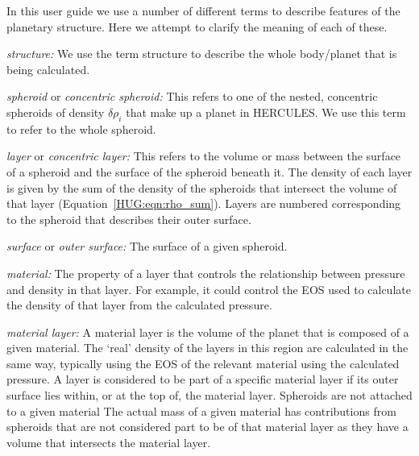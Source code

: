 \documentclass[11pt, oneside]{article}   	%
\begin{document}
%
\vspace{0.5cm}
\begin{tcolorbox}[colback=white, colframe=SchoolColor, title=Note on nomenclature]
In this user guide we use a number of different terms to describe features of the planetary structure.
Here we attempt to clarify the meaning of each of these.

\setlength{\parskip}{15pt}
\setlength{\leftskip}{1.5cm}
\setlength{\parindent}{-1.5cm}

{\it structure:} \newline
We use the term structure to describe the whole body/planet that is being calculated.

{\it spheroid} or {\it concentric spheroid:} \newline
This refers to one of the nested, concentric spheroids of density $\delta\rho_i$ that make up a planet in HERCULES. We use this term to refer to the whole spheroid.

{\it layer} or {\it concentric layer:} \newline
 This refers to the volume or mass between the surface of a spheroid and the surface of the spheroid beneath it. The density of each layer is given by the sum of the density of the spheroids that intersect the volume of that layer (Equation~\ref{HUG:eqn:rho_sum}). Layers are numbered corresponding to the spheroid that describes their outer surface.
 
 {\it surface} or {\it outer surface:} \newline
The surface of a given spheroid.

{\it material:} \newline The property of a layer that controls the relationship between pressure and density in that layer. For example, it could control the EOS used to calculate the density of that layer from the calculated pressure.

{\it material layer:} \newline  A material layer is the volume of the planet that is composed of a given material. 
The `real' density of the layers in this region are calculated in the same way, typically using the EOS of the relevant material using the calculated pressure.
A layer is considered to be part of a specific material layer if its outer surface lies within, or at the top of, the material layer.
Spheroids are not attached to a given material 
The actual mass of a given material has contributions from spheroids that are not considered part to be of that material layer as they have a volume that intersects the material layer.


\setlength{\leftskip}{0pt}
\setlength{\parskip}{0 pt}
\setlength{\parindent}{15pt}

\end{tcolorbox}
\end{document}
